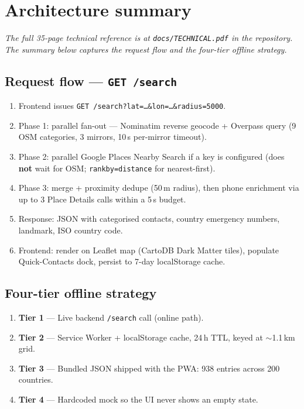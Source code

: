 \documentclass[11pt, a4paper]{article}
\newcommand{\file}[1]{\texttt{\small\color{rsblue}#1}}
\newcommand{\code}[1]{\texttt{\small#1}}
\begin{document}
\section{Architecture summary}

\textit{The full 35-page technical reference is at \file{docs/TECHNICAL.pdf} in the repository.
The summary below captures the request flow and the four-tier offline strategy.}

\subsection{Request flow --- \code{GET /search}}

\begin{enumerate}
  \item Frontend issues \code{GET /search?lat=\ldots\&lon=\ldots\&radius=5000}.
  \item Phase 1: parallel fan-out --- Nominatim reverse geocode + Overpass query
        (9 OSM categories, 3 mirrors, 10\,s per-mirror timeout).
  \item Phase 2: parallel Google Places Nearby Search if a key is configured
        (does \textbf{not} wait for OSM; \code{rankby=distance} for nearest-first).
  \item Phase 3: merge + proximity dedupe (50\,m radius), then phone enrichment
        via up to 3 Place Details calls within a 5\,s budget.
  \item Response: JSON with categorised contacts, country emergency numbers,
        landmark, ISO country code.
  \item Frontend: render on Leaflet map (CartoDB Dark Matter tiles), populate
        Quick-Contacts dock, persist to 7-day localStorage cache.
\end{enumerate}

\subsection{Four-tier offline strategy}

\begin{enumerate}
  \item \textbf{Tier 1} --- Live backend \code{/search} call (online path).
  \item \textbf{Tier 2} --- Service Worker + localStorage cache, 24\,h TTL,
        keyed at $\sim$1.1\,km grid.
  \item \textbf{Tier 3} --- Bundled JSON shipped with the PWA:
        938 entries across 200 countries.
  \item \textbf{Tier 4} --- Hardcoded mock so the UI never shows an empty state.
\end{enumerate}
\end{document}

